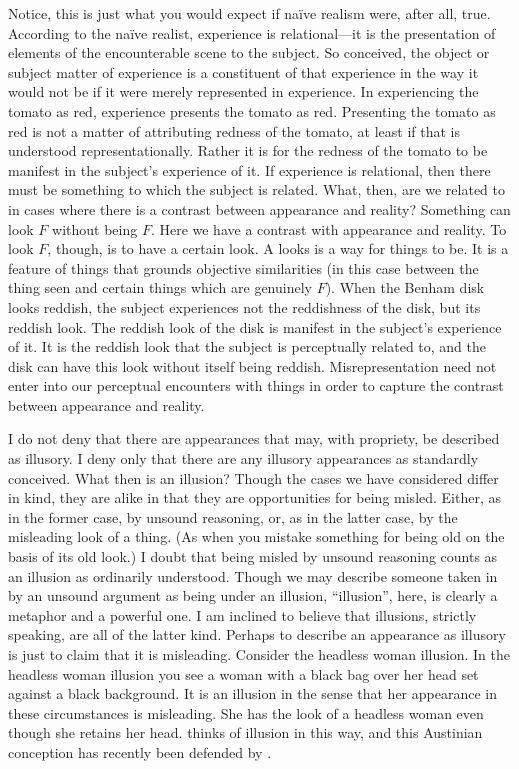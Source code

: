 \documentclass[12pt]{article}
\begin{document}
Notice, this is just what you would expect if naïve realism were, after all, true. According to the naïve realist, experience is relational---it is the presentation of elements of the encounterable scene to the subject. So conceived, the object or subject matter of experience is a constituent of that experience in the way it would not be if it were merely represented in experience. In experiencing the tomato as red, experience presents the tomato as red. Presenting the tomato as red is not a matter of attributing redness of the tomato, at least if that is understood representationally. Rather it is for the redness of the tomato to be manifest in the subject's experience of it. If experience is relational, then there must be something to which the subject is related. What, then, are we related to in cases where there is a contrast between appearance and reality? Something can look \( F \) without being \( F \). Here we have a contrast with appearance and reality. To look \( F \), though, is to have a certain look. A looks is a way for things to be. It is a feature of things that grounds objective similarities (in this case between the thing seen and certain things which are genuinely \( F \)). When the Benham disk looks reddish, the subject experiences not the reddishness of the disk, but its reddish look. The reddish look of the disk is manifest in the subject's experience of it. It is the reddish look that the subject is perceptually related to, and the disk can have this look without itself being reddish. Misrepresentation need not enter into our perceptual encounters with things in order to capture the contrast between appearance and reality.

I do not deny that there are appearances that may, with propriety, be described as illusory. I deny only that there are any illusory appearances as standardly conceived. What then is an illusion? Though the cases we have considered differ in kind, they are alike in that they are opportunities for being misled. Either, as in the former case, by unsound reasoning, or, as in the latter case, by the misleading look of a thing. (As when you mistake something for being old on the basis of its old look.) I doubt that being misled by unsound reasoning counts as an illusion as ordinarily understood. Though we may describe someone taken in by an unsound argument as being under an illusion, ``illusion'', here, is clearly a metaphor and a powerful one. I am inclined to believe that illusions, strictly speaking, are all of the latter kind. Perhaps to describe an appearance as illusory is just to claim that it is misleading. Consider the headless woman illusion. In the headless woman illusion you see a woman with a black bag over her head set against a black background. It is an illusion in the sense that her appearance in these circumstances is misleading. She has the look of a headless woman even though she retains her head. \citet{Austin:1962lr} thinks of illusion in this way, and this Austinian conception has recently been defended by \citep[68]{Travis:2004kx} \citep[for a similar recent account see][]{Brewer:2008fv}.
\end{document}
